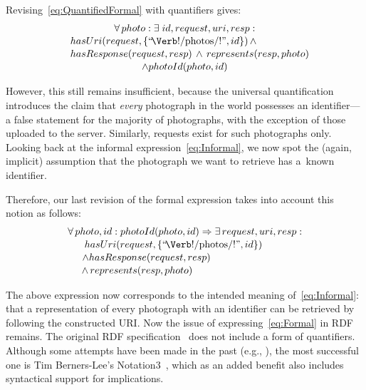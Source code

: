 \documentclass[runningheads,a4paper, twocolumn]{llncs}
\begin{document}
Revising~\ref{eq:QuantifiedFormal} with quantifiers gives:
\begin{multline}\label{eq:QuantifiedFormal}
    \makebox[4.4cm]{$\forall\, photo : \exists\; id, request, uri, resp :$} \\[-.2em]
    \shoveleft{hasUri(request, \{\mbox{``\!\Verb!/photos/!''}, id\})\, \land} \\[-.2em]
    \shoveleft{hasResponse(request, resp) \,\land\, represents(resp, photo)}\\[-.2em]
    \land photoId(photo, id)
\end{multline}

\noindent However, this still remains insufficient, because the universal quantification introduces the claim that \emph{every} photograph in the world possesses an identifier---a false statement for the majority of photographs, with the exception of those uploaded to the server. Similarly, requests exist for such photographs only. Looking back at the informal expression~\ref{eq:Informal}, we now spot the (again, implicit) assumption that the photograph we want to retrieve has a~known identifier.

Therefore, our last revision of the formal expression takes into account this notion as follows:
\begin{multline}\label{eq:Formal}
    \makebox[7.8cm]{$\forall\, photo, id : photoId(photo, id) \Rightarrow
                    \exists\, request, uri, resp :$}\\[-.2em]
    \shoveleft{hasUri(request, \{\mbox{``\!\Verb!/photos/!''}, id\})} \\[-.2em]
    \shoveleft{\land hasResponse(request, resp)} \\[-.2em]
    \land\, represents(resp, photo)\makebox[3.38cm]{}
\end{multline}

The above expression now corresponds to the intended meaning of~\ref{eq:Informal}: that a representation of every photograph with an identifier can be retrieved by following the constructed URI. Now the issue of expressing~\ref{eq:Formal} in RDF remains. The original RDF specification~\cite{RDF} does not include a form of quantifiers. Although some attempts have been made in the past (e.g., \cite{RDFQuantifiers}), the most successful one is Tim Berners-Lee's Notation3~\cite{Notation3}, which as an added benefit also includes syntactical support for implications.
\end{document}
